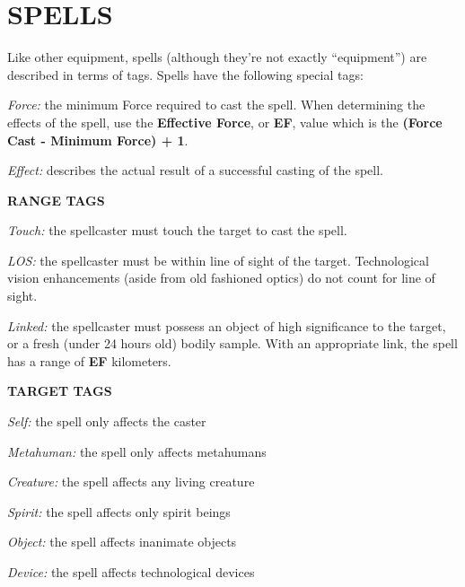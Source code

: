 \documentclass[oneside,10pt]{article}
\begin{document}
\section{SPELLS}
\begin{multicols}{2}
Like other equipment, spells (although they’re not exactly 
  ``equipment'') are described in terms of tags. Spells have the 
      following special tags: 

\begin{dent}

      \textit{Force:} the minimum Force required to 
      cast the spell. When determining the effects of the spell, use the \textbf{Effective Force}, or \textbf{EF}, value which is the \textbf{(Force Cast - Minimum Force) + 1}.

      \textit{Effect:} describes the actual result of a successful casting of 
      the spell. 
\end{dent}

\textbf{RANGE TAGS }


\begin{dent}

\textit{Touch:} the spellcaster must touch the target to cast the
spell.

\textit{LOS:} the spellcaster must be within line of sight of the target. Technological vision enhancements (aside from old fashioned optics) do not count for line of sight.

\textit{Linked:} the spellcaster must possess an object of high significance to the target, or a fresh (under 24 hours old) bodily sample. With an appropriate link, the spell has a range of \textbf{EF} kilometers.

\end{dent}

\textbf{TARGET TAGS}

\begin{dent}

\textit{Self:} the spell only affects the caster

\textit{Metahuman:} the spell only affects metahumans

\textit{Creature:} the spell affects any living creature

\textit{Spirit:} the spell affects only spirit beings

\textit{Object:} the spell affects inanimate objects

\textit{Device:} the spell affects technological devices
\end{dent}


\end{multicols}
\end{document}
